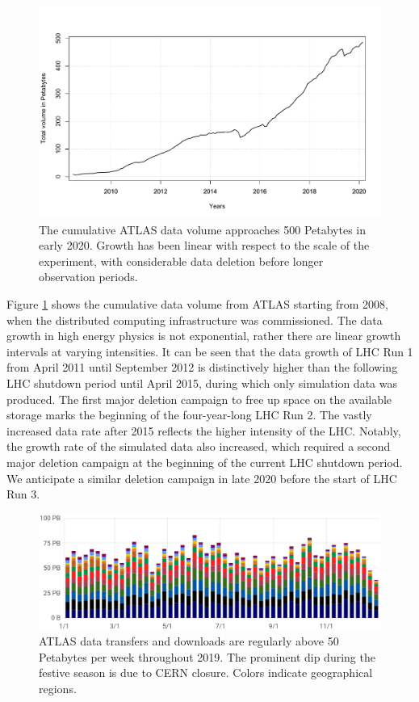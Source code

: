 \documentclass[11pt]{article}
\begin{document}
\begin{figure}[t]
        \centering
        \includegraphics[width=\textwidth]{figs/data_evolution.pdf}
        \caption{The cumulative ATLAS data volume approaches 500 Petabytes in early 2020. Growth has been linear with respect to the scale of the experiment, with considerable data deletion before longer observation periods.}
        \label{fig:atlas_volume}
\end{figure}

Figure \ref{fig:atlas_volume} shows the cumulative data volume from ATLAS starting from 2008, when the distributed computing infrastructure was commissioned. The data growth in high energy physics is not exponential, rather there are linear growth intervals at varying intensities. It can be seen that the data growth of LHC Run 1 from April 2011 until September 2012 is distinctively higher than the following LHC shutdown period until April 2015, during which only simulation data was produced. The first major deletion campaign to free up space on the available storage marks the beginning of the four-year-long LHC Run 2. The vastly increased data rate after 2015 reflects the higher intensity of the LHC. Notably, the growth rate of the simulated data also increased, which required a second major deletion campaign at the beginning of the current LHC shutdown period. We anticipate a similar deletion campaign in late 2020 before the start of LHC Run 3.

\begin{figure}[t]
        \centering
        \includegraphics[width=\textwidth]{figs/ATLAS_Flow.png}
        \caption{ATLAS data transfers and downloads are regularly above 50 Petabytes per week throughout 2019. The prominent dip during the festive season is due to CERN closure. Colors indicate geographical regions.}
        \label{fig:atlas_transfer_rate}
\end{figure}
\end{document}
